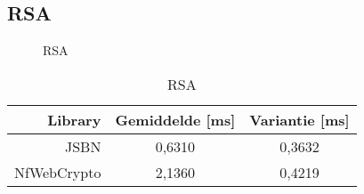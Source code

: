 \subsection{RSA}

\begin{figure}
  \caption{RSA}
  \label{fig:wc:rsa}
\end{figure}

\begin{table}
  \begin{center}
    \begin{tabular}{r | c c}
      Library & Gemiddelde [ms] & Variantie [ms] \\ \hline
      JSBN & 0,6310 & 0,3632  \\
      NfWebCrypto & 2,1360 & 0,4219
    \end{tabular}
    \caption{RSA}
    \label{tab:wc:modular_exponentiation}
  \end{center}
\end{table}
